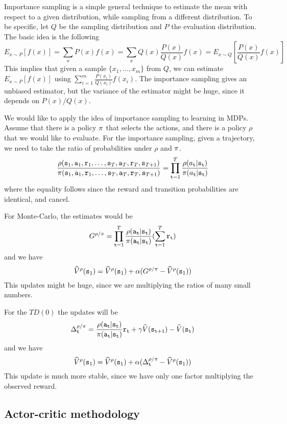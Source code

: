 Importance sampling is a simple general technique to estimate the
mean with respect to a given distribution, while sampling from a
different distribution. To be specific, let $Q$ be the sampling
distribution and $P$ the evaluation distribution. The basic idea is
the following
\[
E_{x\sim P}[f(x)]=\sum_x P(x)f(x)=\sum_x Q(x)\frac{P(x)}{Q(x)}
f(x)=E_{x\sim Q} [\frac{P(x)}{Q(x)}f(x)]
\]
This implies that given a sample $\{x_1, \ldots , x_m\}$ from $Q$,
we can estimate $E_{x\sim P}[f(x)]$ using $\sum_{i=1}^m
\frac{P(x_i)}{Q(x_i)}f(x_i)$.
%
The importance sampling gives an unbiased estimator, but the
variance of the estimator might be huge, since it depends on
$P(x)/Q(x)$.

We would like to apply the idea of importance sampling to learning
in MDPs. Assume that there is a policy $\pi$ that selects the
actions, and there is a policy $\rho$ that we would like to
evaluate. For the importance sampling, given a trajectory, we need
to take the ratio of probabilities under $\rho$ and $\pi$.
\[
\frac{\rho({\tt s}_1,{\tt a}_1,{\tt r}_1,
\ldots,{\tt s}_{T},{\tt a}_{T},{\tt r}_T,{\tt s}_{T+1})}{\pi({\tt s}_1,{\tt a}_1,{\tt r}_1,
\ldots,{\tt s}_{T},{\tt a}_{T},{\tt r}_T,{\tt s}_{T+1})}=\prod_{{\tt t}=1}^T
\frac{\rho(a_{\tt t}|{\tt s}_{\tt t})}{\pi(a_{\tt t}|{\tt s}_{\tt t})}
\]
where the equality follows since the reward and transition
probabilities are identical, and cancel.

For Monte-Carlo, the estimates would be
\[
G^{\rho/\pi}=\prod_{{\tt t}=1}^T
\frac{\rho({\tt a}_{\tt t}|{\tt s}_{\tt t})}{\pi({\tt a}_{\tt t}|{\tt s}_{\tt t})}
(\sum_{{\tt t}=1}^T {\tt r}_{\tt t})
\]
and we have
\[
\widehat{V}^\rho ({\tt s}_1) = \widehat{V}^\rho({\tt s}_1) +\alpha(
G^{\rho/\pi}- \widehat{V}^\rho({\tt s}_1))
\]
This updates might be huge, since we are multiplying the ratios of
many small numbers.

For the $TD(0)$ the updates will be
\[
\Delta^{\rho/\pi}_{\tt t}
=\frac{\rho({\tt a}_{\tt t}|{\tt s}_{\tt t})}{\pi({\tt a}_{\tt t}|{\tt s}_{\tt t})}{\tt r}_{\tt t}
+\gamma \widehat{V}({\tt s}_{{\tt t}+1})-\widehat{V}({\tt s}_{\tt t})
\]
and we have
\[
\widehat{V}^\rho ({\tt s}_1) = \widehat{V}^\rho({\tt s}_1) +\alpha(
\Delta^{\rho/\pi}_{\tt t}- \widehat{V}^\rho({\tt s}_1))
\]
This update is much more stable, since we have only one factor
multiplying the observed reward.


\subsection{Actor-critic methodology}
\label{section:actor-critic}

